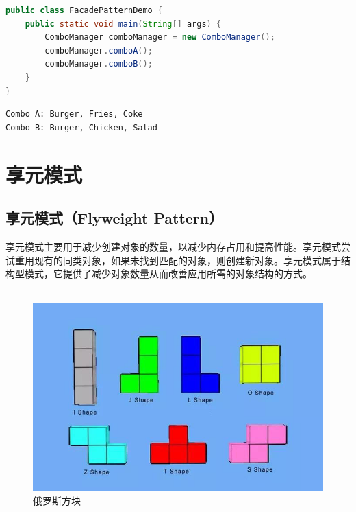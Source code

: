 \begin{lstlisting}[language=Java, title=FacadePatternDemo.java]
public class FacadePatternDemo {
    public static void main(String[] args) {
        ComboManager comboManager = new ComboManager();
        comboManager.comboA();
        comboManager.comboB();
    }
}
\end{lstlisting}

\begin{tcolorbox}
    \begin{verbatim}
Combo A: Burger, Fries, Coke
Combo B: Burger, Chicken, Salad
\end{verbatim}
\end{tcolorbox}

\newpage

\section{享元模式}

\subsection{享元模式（Flyweight Pattern）}

享元模式主要用于减少创建对象的数量，以减少内存占用和提高性能。享元模式尝试重用现有的同类对象，如果未找到匹配的对象，则创建新对象。享元模式属于结构型模式，它提供了减少对象数量从而改善应用所需的对象结构的方式。\\

\\

\begin{figure}[H]
    \centering
    \includegraphics[scale=0.6]{img/Chapter4/4-13/1.png}
    \caption{俄罗斯方块}
\end{figure}

